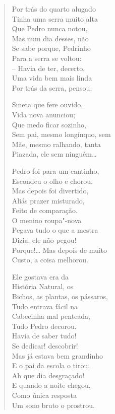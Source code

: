 {\begin{verse}
Por trás do quarto alugado\\
Tinha uma serra muito alta\\
Que Pedro nunca notou,\\
Mas num dia desses, não\\
Se sabe porque, Pedrinho\\
Para a serra se voltou:\\
-- Havia de ter, decerto,\\
Uma vida bem mais linda\\
Por trás da serra, pensou.

Sineta que fere ouvido,\\
Vida nova anunciou;\\
Que medo ficar sozinho,\\
Sem pai, mesmo longínquo, sem\\
Mãe, mesmo ralhando, tanta\\
Piazada, ele sem ninguém\ldots{}

Pedro foi para um cantinho,\\
Escondeu o olho e chorou.\\
Mas depois foi divertido,\\
Aliás prazer misturado,\\
Feito de comparação.\\
O menino roupa"-nova\\
Pegava tudo o que a mestra\\
Dizia, ele não pegou!\\
Porque!\ldots{} Mas depois de muito\\
Custo, a coisa melhorou.

Ele gostava era da\\
História Natural, os\\
Bichos, as plantas, os pássaros,\\
Tudo entrava fácil na\\
Cabecinha mal penteada,\\
Tudo Pedro decorou.\\
Havia de saber tudo!\\
Se dedicar! descobrir!\\
Mas já estava bem grandinho\\
E o pai da escola o tirou.\\
Ah que dia desgraçado!\\
E quando a noite chegou,\\
Como única resposta\\
Um sono bruto o prostrou.


\end{verse}}
